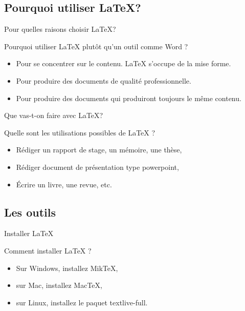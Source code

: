 \documentclass{beamer}
\begin{document}
\subsection{Pourquoi utiliser \LaTeX ?}
\begin{frame}{Pour quelles raisons choisir \LaTeX ?}
	\begin{block}{Pourquoi utiliser \LaTeX{} plutôt qu'un outil comme Word ?}
		\begin{itemize}
			\item Pour se concentrer sur le contenu. \LaTeX{} s'occupe de la mise forme.
			\item Pour produire des documents de qualité professionnelle.
			\item Pour produire des documents qui produiront toujours le même contenu.
		\end{itemize}
	\end{block}
\end{frame}

\begin{frame}{Que vas-t-on faire avec \LaTeX ?}
	\begin{block}{Quelle sont les utilisations possibles de \LaTeX{} ?}
		\begin{itemize}
			\item Rédiger un rapport de stage, un mémoire, une thèse,
			\item Rédiger document de présentation type powerpoint,
			\item Écrire un livre, une revue, etc.
		\end{itemize}
	\end{block}
\end{frame}

\subsection{Les outils}
\begin{frame}{Installer \LaTeX}
	\begin{block}{Comment installer \LaTeX{} ?}
		\begin{itemize}
			\item Sur Windows, installez MikTeX,
			\item sur Mac, installez MacTeX,
			\item sur Linux, installez le paquet textlive-full.
		\end{itemize}
	\end{block}
\end{frame}
\end{document}
